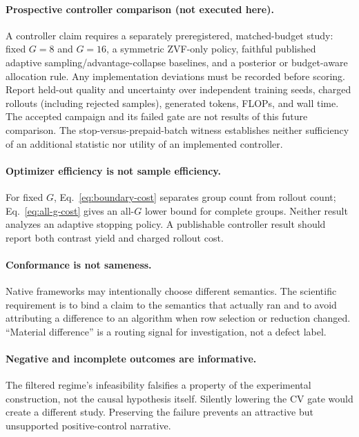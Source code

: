 \documentclass{article}
\begin{document}
\paragraph{Prospective controller comparison (not executed here).}
A controller claim requires a separately preregistered, matched-budget study:
fixed $G=8$ and $G=16$, a symmetric ZVF-only policy, faithful published adaptive
sampling/advantage-collapse baselines, and a posterior or budget-aware
allocation rule. Any implementation deviations must be recorded before scoring.
Report held-out quality and uncertainty over independent training seeds,
charged rollouts (including rejected samples), generated tokens, FLOPs, and
wall time. The accepted campaign and its failed gate are not results of this
future comparison. The stop-versus-prepaid-batch witness establishes neither
sufficiency of an additional statistic nor utility of an implemented controller.

\paragraph{Optimizer efficiency is not sample efficiency.}
For fixed $G$, Eq.~\eqref{eq:boundary-cost} separates group count from rollout
count; Eq.~\eqref{eq:all-g-cost} gives an all-$G$ lower bound for complete
groups.  Neither result analyzes an adaptive stopping policy.  A publishable
controller result should report both contrast yield and charged rollout cost.

\paragraph{Conformance is not sameness.}
Native frameworks may intentionally choose different semantics.  The scientific
requirement is to bind a claim to the semantics that actually ran and to avoid
attributing a difference to an algorithm when row selection or reduction
changed.  ``Material difference'' is a routing signal for investigation, not a
defect label.

\paragraph{Negative and incomplete outcomes are informative.}
The filtered regime's infeasibility falsifies a property of the experimental
construction, not the causal hypothesis itself.  Silently lowering the CV gate
would create a different study.  Preserving the failure prevents an attractive
but unsupported positive-control narrative.
\end{document}
